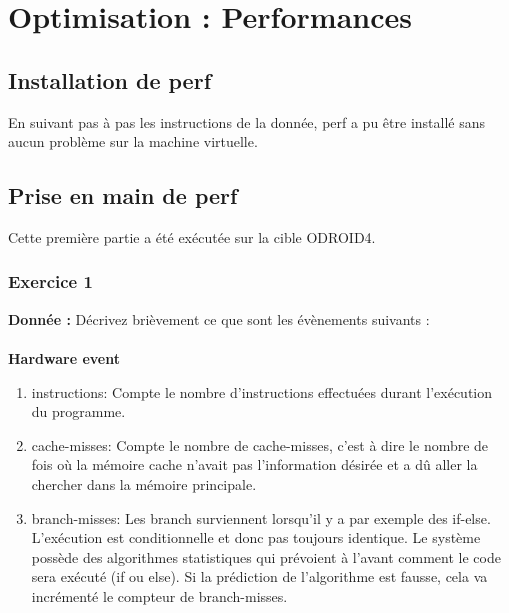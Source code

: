 \section{Optimisation : Performances}
\subsection{Installation de perf}
En suivant pas à pas les instructions de la donnée, perf a pu être installé sans aucun problème sur la machine virtuelle. 
\subsection{Prise en main de perf}
Cette première partie a été exécutée sur la cible ODROID4.
\subsubsection{Exercice 1}
\textbf{Donnée : } Décrivez	brièvement	ce	que	sont	les	évènements	suivants	:\\\\
\textbf{Hardware event}
\begin{enumerate}
	\item instructions: Compte le nombre d'instructions effectuées durant l'exécution du programme.
	\item cache-misses: Compte le nombre de cache-misses, c'est à dire le nombre de fois où la mémoire cache n'avait pas l'information désirée et a dû aller la chercher dans la mémoire principale.
	\item branch-misses: Les branch surviennent lorsqu'il y a par exemple des if-else. L'exécution est conditionnelle et donc pas toujours identique. Le système possède des algorithmes statistiques qui prévoient à l'avant comment le code sera exécuté (if ou else). Si la prédiction de l'algorithme est fausse, cela va incrémenté le compteur de branch-misses.
\end{enumerate}


